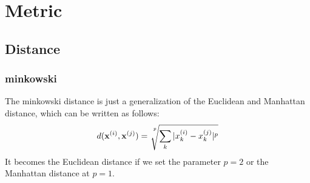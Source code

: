 \chapter{Metric}
\section{Distance}
\subsection{minkowski}
The minkowski distance is just a generalization of the Euclidean and Manhattan distance, which can be written as follows:
\begin{equation}
    d(\textbf{x}^{(i)},\textbf{x}^{(j)})=\sqrt[\leftroot{-2}\uproot{15}p]{\sum_{k}^{}|x_k^{(i)}-x_k^{(j)}|^p}
\end{equation}
It becomes the Euclidean distance if we set the parameter $p=2$ or the Manhattan distance at $p=1$.